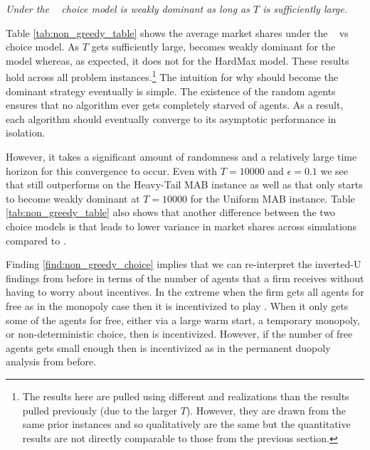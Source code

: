 \documentclass[../competing_bandits.tex]{subfiles}
\begin{document}
\normalsize


\begin{finding}\label{find:non_greedy_choice}
\textit{Under the \HMR~ choice model \TS is weakly dominant as long as $T$ is sufficiently large. }
\end{finding}



Table \ref{tab:non_greedy_table} shows the average market shares under the \HM~ vs \HMR~ choice model. As $T$ gets sufficiently large, \TS becomes weakly dominant for the \HMR model whereas, as expected, it does not for the HardMax model. These results hold across all problem instances.\footnote{The results here are pulled using different \MRV and realizations than the results pulled previously (due to the larger $T$). However, they are drawn from the same prior instances and so qualitatively are the same but the quantitative results are not directly comparable to those from the previous section.} The intuition for why \TS should become the dominant strategy eventually is simple. The existence of the random agents ensures that no algorithm ever gets completely starved of agents. As a result, each algorithm should eventually converge to its asymptotic performance in isolation.

However, it takes a significant amount of randomness and a relatively large time horizon for this convergence to occur. Even with $T = 10000$ and $\epsilon = 0.1$ we see that \DEG still outperforms \DG on the Heavy-Tail MAB instance as well as that \TS only starts to become weakly dominant at $T = 10000$ for the Uniform MAB instance. Table \ref{tab:non_greedy_table} also shows that another difference between the two choice models is that \HMR leads to lower variance in market shares across simulations compared to \HM.

Finding \ref{find:non_greedy_choice} implies that we can re-interpret the inverted-U findings from before in terms of the number of agents that a firm receives without having to worry about incentives. In the extreme when the firm gets all agents for free as in the monopoly case then it is incentivized to play \DG. When it only gets some of the agents for free, either via a large warm start, a temporary monopoly, or non-deterministic choice, then \TS is incentivized. However, if the number of free agents gets small enough then \DG is incentivized as in the permanent duopoly analysis from before.
\end{document}
